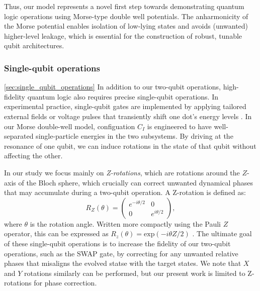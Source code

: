 \documentclass{subfiles}
\begin{document}
Thus, our model represents a novel first step towards demonstrating quantum logic operations using Morse-type double well potentials. The anharmonicity of the Morse potential enables isolation of low-lying states and avoids (unwanted) higher-level leakage, which is essential for the construction of robust, tunable qubit architectures\cite{nielsen2010quantum}.

\subsubsection*{Single-qubit operations}\ref{sec:single_qubit_operations}
In addition to our two-qubit operations, high-fidelity quantum logic also requires precise single-qubit operations.  In experimental practice, single-qubit gates are implemented by applying tailored external fields or voltage pulses that transiently shift one dot's energy levels \cite{mcdermott2014accurate}. In our Morse double-well model, configuation $C_I$ is engineered to have well-separated single-particle energies in the two subsystems. By driving at the resonance of one qubit, we can induce rotations in the state of that qubit without affecting the other. 

In our study we focus mainly on \emph{Z-rotations}, which are rotations around the $Z$-axis of the Bloch sphere, which crucially can correct unwanted dynamical phases that may accumulate during a two-qubit operation. A Z-rotation is defined as:
\begin{equation}
    R_Z(\theta) = \begin{pmatrix}
    e^{-i\theta/2} & 0 \\
    0 & e^{i\theta/2}
    \end{pmatrix} \label{eq:z_rotation_gate},
\end{equation}
where $\theta$ is the rotation angle. Written more compactly using the Pauli $Z$ operator, this can be expressed as $R_z(\theta) = \text{exp}(-i\theta Z/2)$ \cite{nielsen2010quantum}. The ultimate goal of these single-qubit operations is to increase the fidelity of our two-qubit operations, such as the SWAP gate, by correcting for any unwanted relative phases that misaligns the evolved statse with the target states. We note that $X$ and $Y$ rotations similarly can be performed, but our present work is limited to Z-rotations for phase correction.
\end{document}
